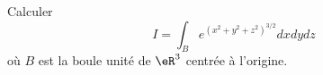 
\begin{exercice}\label{exoOutilsMath-0094}

Calculer
\begin{equation}
    I=\int_B e^{(x^2+y^2+z^2)^{3/2}}dxdydz
\end{equation}
où $B$ est la boule unité de $\eR^3$ centrée à l'origine.

\end{exercice}
